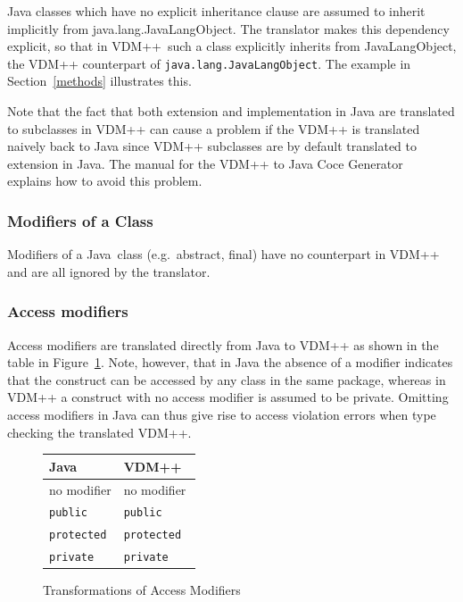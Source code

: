 \documentclass[\pformat,12pt]{article}
\newcommand{\JAVA}{Java}
\newcommand{\VDM}{VDM++}
\begin{document}
Java classes which have no explicit inheritance clause are assumed to
inherit implicitly from java.lang.JavaLangObject. The translator makes this
dependency explicit, so that in \VDM\ such a class explicitly inherits
from JavaLangObject, the VDM++ counterpart of
\texttt{java.lang.JavaLangObject}. The example in Section~\ref{methods}
illustrates this.

Note that the fact that both extension and implementation in Java are
translated to subclasses in VDM++ can cause a problem if the VDM++ is
translated naively back to Java since VDM++ subclasses are by default
translated to extension in Java. The manual for the VDM++ to Java Coce
Generator~\cite{CGJavaManPP-SCSK} explains how to avoid this problem. 

\subsubsection{Modifiers of a Class}

Modifiers of a \JAVA\ class (e.g.\ abstract, final) have no
counterpart in VDM++ and are all ignored by the translator. 

\subsubsection{Access modifiers}

Access modifiers are translated directly from Java to VDM++ as shown
in the table in Figure~\ref{fig:accessxfs}. Note, however, that in Java the absence
of a modifier indicates that the construct can be accessed by any
class in the same package, whereas in VDM++ a construct with no access
modifier is assumed to be private. Omitting access modifiers in Java
can thus give rise to access violation errors when type checking the
translated VDM++. 

\begin{figure}[htbp]
  \begin{center}
\begin{longtable}{|l|l|}
\hline
  \JAVA\   & \VDM\ \\ \hline \hline
  no modifier         & no modifier        \\ \hline
  \texttt{public}     & \texttt{public}    \\ \hline
  \texttt{protected}  & \texttt{protected} \\ \hline
  \texttt{private}  & \texttt{private} \\ \hline
\end{longtable}    
    \caption{Transformations of Access Modifiers}
    \label{fig:accessxfs}
  \end{center}
\end{figure}
\end{document}
